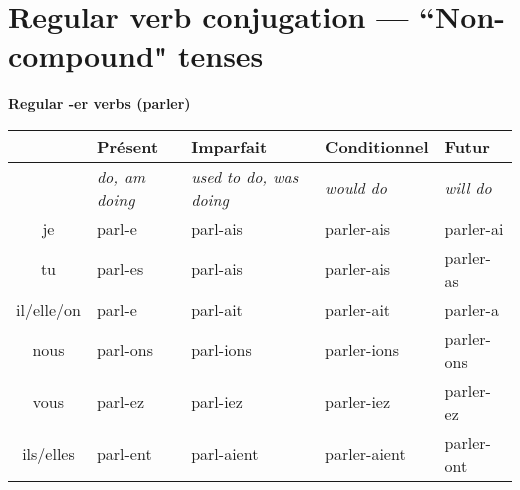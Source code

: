 

\section{Regular verb conjugation --- ``Non-compound" tenses}
\setcounter{theorem}{0}
\setcounter{equation}{0}

\newcommand{\stemPresent}{parl}
\newcommand{\stemFutur}{parler}
\begin{center}
\textbf{Regular -er verbs (parler)}
\vskip 0.1cm
\begin{tabular}{|c||L{3cm}|L{3cm}|L{3cm}|L{3cm}|}
\hline
& Pr\'esent & Imparfait & Conditionnel & Futur \\
\hline
& \textit{do, am doing} & \textit{used to do, was doing} & \textit{would do} & \textit{will do} \\
\hline\hline
je            &	\stemPresent-e	&	\stemPresent-ais	&	\stemFutur-ais	 &	\stemFutur-ai	\\
tu            &	\stemPresent-es	&	\stemPresent-ais	&	\stemFutur-ais	&	\stemFutur-as	\\
il/elle/on  &	\stemPresent-e	&	\stemPresent-ait	&	\stemFutur-ait	&	\stemFutur-a	\\
nous       &	\stemPresent-ons	&	\stemPresent-ions	&	\stemFutur-ions	&	\stemFutur-ons	\\
vous       &	\stemPresent-ez	&	\stemPresent-iez	&	\stemFutur-iez		&	\stemFutur-ez	\\
ils/elles   &	\stemPresent-ent	&	\stemPresent-aient	&	\stemFutur-aient	&	\stemFutur-ont	\\
\hline
\end{tabular}
\end{center}

